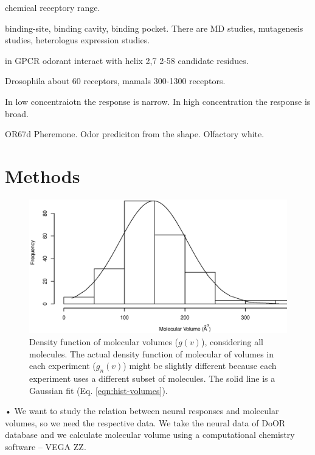\documentclass[11pt]{paper} %
\begin{document}
chemical receptory range.


binding-site, binding cavity, binding pocket.
There are MD studies, 
mutagenesis studies,
heterologus expression studies.

in GPCR odorant interact with helix 2,7
2-58 candidate residues.

Drosophila about 60 receptors, mamals 300-1300 receptors. 

In low concentraiotn the response is narrow. In high concentration the response is broad.

OR67d Pheremone. 
Odor prediciton from the shape.
Olfactory white.



\section{Methods}
\begin{figure}
	\centering
	\includegraphics[width=0.5 \textwidth]{fig/hist-volumes}
	\caption{Density function of molecular volumes ($g(v)$), considering all molecules. 
		The actual density function of molecular of volumes in each experiment ($g_n(v)$) might be slightly different 
		because each experiment uses a different subset of molecules. 
		The solid line is a Gaussian fit (Eq. \ref{eqn:hist-volumes}).}
	\label{fig:hist-volumes}
\end{figure}•
We want to study the relation between neural responses and molecular volumes, so we need the respective data. 
We take the neural data of DoOR database \cite{DoOR2010} and we calculate molecular volume using a computational chemistry software -- VEGA ZZ. 
\end{document}
